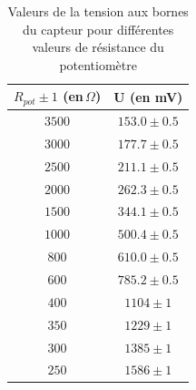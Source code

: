 \documentclass[12pt]{article}
\begin{document}
\begin{table}[h!]
	\begin{center}
		\begin{tabular}{|c|c|}
\hline
 $R_{pot}\pm 1$ (en\,$ \Omega$) &  U (en mV) \\
\hline
  $3500$ &      $153.0\pm 0.5$ \\
  $3000$ &      $177.7\pm 0.5$ \\
  $2500$ &      $211.1\pm 0.5$ \\
  $2000$ &      $262.3\pm 0.5$ \\
  $1500$ &      $344.1\pm 0.5$ \\
  $1000$ &      $500.4\pm 0.5$ \\
   $800$ &      $610.0\pm 0.5$ \\
   $600$ &      $785.2\pm 0.5$ \\
   $400$ &     $1104 \pm 1$ \\
   $350$ &     $1229 \pm 1$ \\
   $300$ &     $1385 \pm 1$ \\
   $250$ &     $1586\pm 1$ \\
\hline
\end{tabular}
	\end{center}
	\label{Tableau_puissance}
	\caption{Valeurs de la tension aux bornes du capteur pour différentes valeurs de résistance du potentiomètre}
\end{table}
\end{document}
